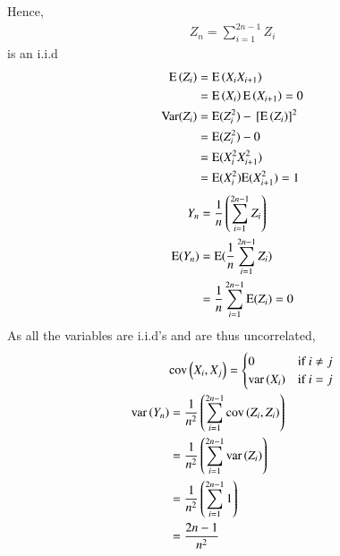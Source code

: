 \documentclass[journal,12pt,Twocolumn]{IEEEtran}
\theoremstyle{remark}
\begin{document}
Hence,
\begin{align} Z_n=\sum_{i=1}^{2n-1}Z_i 
\end{align} is an i.i.d 
\begin{align}
\text{E}\left(Z_i\right)&=\text{E}\left(X_iX_{i+1}\right) \\
&=\text{E}\left(X_i\right)\text{E}\left(X_{i+1}\right) = 0 \\
\text{Var}(Z_i)&=\text{E}(Z_i^2)-{}\left[\text{E}\left(Z_i\right)\right]^2 \\
&=\text{E}(Z_i^2)-0 \\ 
&=\text{E}(X_i^2X_{i+1}^2) \\
&=\text{E}(X_{i}^2)\text{E}(X_{i+1}^2) = 1  
\end{align}
\begin{align}
Y_n&=\frac{1}{n}\left(\sum_{i=1}^{2n-1} Z_i\right) \\
\text{E}(Y_n)&=\text{E}(\frac{1}{n}\sum_{i=1}^{2n-1} Z_i) \\
&= \frac{1}{n}\sum_{i=1}^{2n-1} \text{E}(Z_i) = 0 
\end{align}
As all the variables are i.i.d's and are thus uncorrelated,
\begin{align}
&\text{cov}\left(X_i, X_j\right) =
\begin{cases}
	0 & \text{if } i \ne j\\
    \text{var}\left(X_i\right) & \text{if } i = j
\end{cases} \\
\text{var}\left(Y_n\right)&=\frac{1}{n^2}\left(\sum_{i=1}^{2n-1}\text{cov}\left(Z_i, Z_i\right)\right)\\
&= \frac{1}{n^2} \left(\sum_{i=1}^{2n-1} \text{var}\left(Z_i\right)\right)\\
&= \frac{1}{n^2} \left(\sum_{i=1}^{2n-1} 1\right)\\
&= \frac{2n-1}{n^2}
\end{align}
\end{document}
